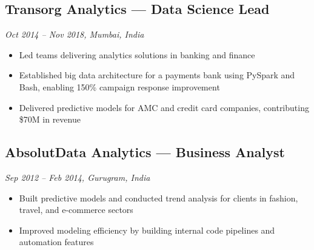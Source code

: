 \documentclass[a4paper,10pt]{article}
\begin{document}
\subsection*{Transorg Analytics — Data Science Lead}
\textit{Oct 2014 – Nov 2018, Mumbai, India}
\begin{itemize}[leftmargin=1em]
    \item Led teams delivering analytics solutions in banking and finance
    \item Established big data architecture for a payments bank using PySpark and Bash, enabling 150\% campaign response improvement
    \item Delivered predictive models for AMC and credit card companies, contributing \$70M in revenue
\end{itemize}

\subsection*{AbsolutData Analytics — Business Analyst}
\textit{Sep 2012 – Feb 2014, Gurugram, India}
\begin{itemize}[leftmargin=1em]
    \item Built predictive models and conducted trend analysis for clients in fashion, travel, and e-commerce sectors
    \item Improved modeling efficiency by building internal code pipelines and automation features
\end{itemize}
\end{document}
